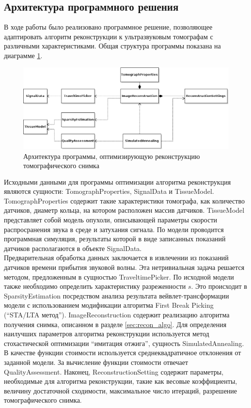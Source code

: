 \documentclass[14pt]{matmex-diploma}
\begin{document}
\subsection{Архитектура программного решения}

В ходе работы было реализовано программное решение, позволяющее адаптировать алгоритм реконструкции к ультразвуковым томографам с различными характеристиками. Общая структура программы показана на диаграмме \ref{fig:software}. 

\begin{figure}[h]
    \centering
    \includegraphics[width=0.95\linewidth]{pics_eps/uml_classes.eps}
    \caption{\small Архитектура программы, оптимизирующую реконструкцию томографического снимка}
    \label{fig:software}
\end{figure}

Исходными данными для программы оптимизации алгоритма реконструкция являются сущности: TomographProperties, SignalData и TissueModel. TomographProperties содержит такие характеристики томографа, как количество датчиков, диаметр кольца, на котором расположен массив датчиков. TissueModel представляет собой модель опухоли, описывающей параметры скорости распросранения звука в среде и затухания сигнала.  По модели проводится программная симуляция, результаты которой в виде записанных показаний датчиков располагаются в объекте SignalData.\\
Предварительная обработка данных заключается в извлечении из показаний датчиков времени прибытия звуковой волны. Эта нетривиальная задача решается методом, предложенным в \cite{li2009improved} сущностью TraveltimePicker. По исходной модели также необходимо определить характеристику разреженности $s$. Это происходит в SparsityEstimation посредством анализа результата вейвлет-трансформации модели с использованием модификации алгоритма First Break Picking (``STA/LTA метод''). ImageReconstruction содержит реализацию алгоритма получения снимка, описанном в разделе \ref{sec:recon_algo}. Для определения наилучших параметров алгоритма реконструкции используется метод стохастической оптимизации ``имитация отжига'', сущность SimulatedAnnealing. В качестве функции стоимости используется среднеквадратичное отклонения от заданной модели. За вычисление функции стоимости отвечает QualityAssessment. Наконец, ReconstructionSetting содержит параметры, необходимые для алгоритма реконструкции, такие как весовые коэффициенты, величину достаточной сходимости, максимальное число итераций, разрешение томографического снимка. 
\end{document}
